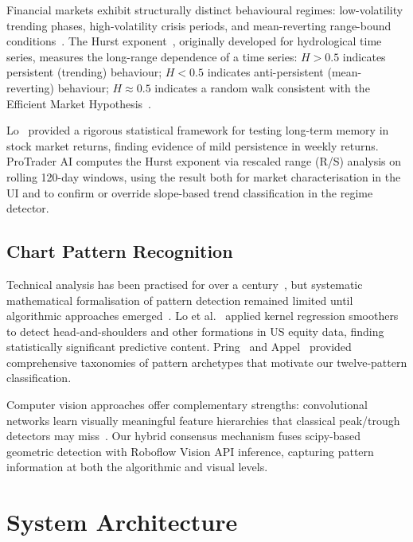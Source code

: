 \documentclass[10pt,a4paper,twoside]{article}
\begin{document}
Financial markets exhibit structurally distinct behavioural regimes: low-volatility
trending phases, high-volatility crisis periods, and mean-reverting range-bound
conditions~\cite{hamilton1989}. The Hurst exponent~\cite{hurst1951}, originally
developed for hydrological time series, measures the long-range dependence of a
time series: $H > 0.5$ indicates persistent (trending) behaviour; $H < 0.5$
indicates anti-persistent (mean-reverting) behaviour; $H \approx 0.5$ indicates
a random walk consistent with the Efficient Market Hypothesis~\cite{lo1991}.

Lo~\cite{lo1991} provided a rigorous statistical framework for testing long-term
memory in stock market returns, finding evidence of mild persistence in weekly
returns. ProTrader AI computes the Hurst exponent via rescaled range (R/S)
analysis on rolling 120-day windows, using the result both for market
characterisation in the UI and to confirm or override slope-based trend
classification in the regime detector.

\subsection{Chart Pattern Recognition}

Technical analysis has been practised for over a century~\cite{murphy1999,
edwards1948}, but systematic mathematical formalisation of pattern detection
remained limited until algorithmic approaches emerged~\cite{lo2000}. Lo et
al.~\cite{lo2000} applied kernel regression smoothers to detect head-and-shoulders
and other formations in US equity data, finding statistically significant
predictive content. Pring~\cite{pring2002} and Appel~\cite{appel2005}
provided comprehensive taxonomies of pattern archetypes that motivate our
twelve-pattern classification.

Computer vision approaches offer complementary strengths: convolutional networks
learn visually meaningful feature hierarchies that classical peak/trough
detectors may miss~\cite{sezer2018}. Our hybrid consensus mechanism fuses
scipy-based geometric detection with Roboflow Vision API inference,
capturing pattern information at both the algorithmic and visual levels.

\section{System Architecture}
\end{document}
